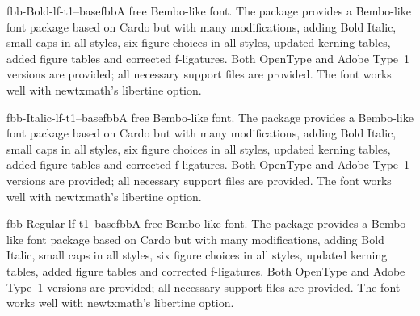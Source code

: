 \documentclass{ddltxtyp}
\begin{document}
\begin{package}{fbb-Bold-lf-t1--base}{fbb}{A free Bembo-like font.}
The package provides a Bembo-like font package based on Cardo
but with many modifications, adding Bold Italic, small caps in
all styles, six figure choices in all styles, updated kerning
tables, added figure tables and corrected f-ligatures. Both
OpenType and Adobe Type~1 versions are provided; all necessary
support files are provided. The font works well with
newtxmath's libertine option.
\end{package}
\begin{package}{fbb-Italic-lf-t1--base}{fbb}{A free Bembo-like font.}
The package provides a Bembo-like font package based on Cardo
but with many modifications, adding Bold Italic, small caps in
all styles, six figure choices in all styles, updated kerning
tables, added figure tables and corrected f-ligatures. Both
OpenType and Adobe Type~1 versions are provided; all necessary
support files are provided. The font works well with
newtxmath's libertine option.
\end{package}
\begin{package}{fbb-Regular-lf-t1--base}{fbb}{A free Bembo-like font.}
The package provides a Bembo-like font package based on Cardo
but with many modifications, adding Bold Italic, small caps in
all styles, six figure choices in all styles, updated kerning
tables, added figure tables and corrected f-ligatures. Both
OpenType and Adobe Type~1 versions are provided; all necessary
support files are provided. The font works well with
newtxmath's libertine option.
\end{package}
\end{document}
